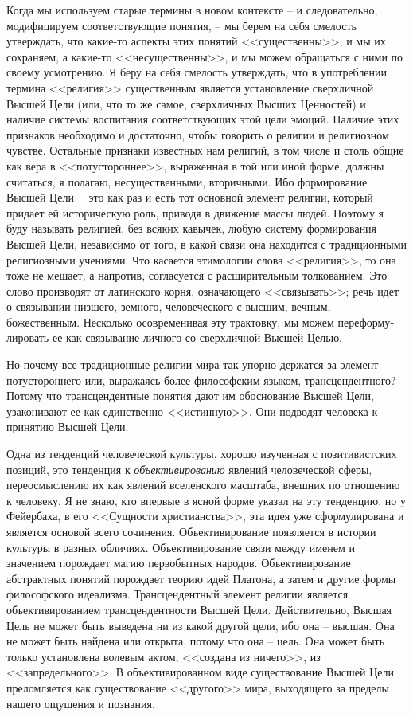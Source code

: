 \documentclass{book}
\begin{document}
Когда мы используем старые термины в новом контексте -- и следовательно, модифицируем соответствующие понятия, -- мы берем на себя смелость утверждать, что какие-то аспекты этих понятий <<существенны>>, и мы их сохраняем, а какие-то <<несущественны>>, и мы можем обращаться с ними по своему усмотрению. Я беру на себя смелость утверждать, что в упот­реблении термина <<религия>> существенным является установ­ление сверхличной Высшей Цели (или, что то же самое, сверх­личных Высших Ценностей) и наличие системы воспитания соответствующих этой цели эмоций. Наличие этих признаков необходимо и достаточно, чтобы говорить о религии и рели­гиозном чувстве. Остальные признаки известных нам религий, в том числе и столь общие как вера в <<потустороннее>>, выра­женная в той или иной форме, должны считаться, я полагаю, несущественными, вторичными. Ибо формирование Высшей Цели   это как раз и есть тот основной элемент религии, кото­рый придает ей историческую роль, приводя в движение массы людей. Поэтому я буду называть 
религией, без 
всяких кавычек, любую систему формирования Высшей Цели, независимо от то­го, в какой связи она находится с традиционными религиоз­ными учениями. Что касается этимологии слова <<религия>>, то она тоже не мешает, а напротив, согласуется с расширитель­ным толкованием. Это слово производят от латинского корня, означающего <<связывать>>; речь идет о связывании низшего, земного, человеческого с высшим, вечным, божественным. Не­сколько осовременивая эту трактовку, мы можем переформу­лировать ее как связывание личного со сверхличной Высшей Целью.

Но почему все традиционные религии мира так упорно держатся за элемент потустороннего или, выражаясь более философским языком, трансцендентного? Потому что трансцендентные понятия дают им обоснование Высшей Цели, узаконивают ее как единственно <<истинную>>. Они подводят человека к принятию Высшей Цели.

Одна из тенденций человеческой культуры, хорошо изучен­ная с позитивистских позиций, это тенденция к \textit{объективированию}  явлений человеческой сферы, переосмыслению их как яв­лений вселенского масштаба, внешних по отношению к чело­веку. Я не знаю, кто впервые в ясной форме указал на эту тен­денцию, но у Фейербаха, в его <<Сущности христианства>>, эта идея уже сформулирована и является основой всего сочинения. Объективирование появляется в истории культуры в разных обличиях. Объективирование связи между именем и значением порождает магию первобытных народов. Объективирование абстрактных понятий порождает теорию идей Платона, а затем и другие формы философского идеализма. Трансцендентный элемент религии является объективированием трансцендент­ности Высшей Цели. Действительно, Высшая Цель не может быть выведена ни из какой другой цели, ибо она -- высшая. Она не может быть найдена или открыта, потому что она -- цель. Она может быть только установлена волевым актом, <<создана из ничего>>, из <<запредельного>>. В 
объективирован­ном виде существование Высшей Цели преломляется как су­ществование <<другого>> мира, выходящего за пределы нашего ощущения и познания.
\end{document}
